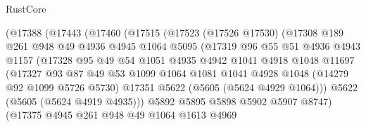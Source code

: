 \begin{lexlean}{RustCore}
\begin{coremodule}
                    (@17388
                      (@17443
                        (@17460
                          (@17515
                            (@17523
                              (@17526 @17530)
                              (@17308
                                @189
                                @261
                                @948
                                @49
                                @4936
                                @4945
                                @1064
                                @5095
                                (@17319
                                  @96
                                  @55
                                  @51
                                  @4936
                                  @4943
                                  @1157
                                  (@17328
                                    @95
                                    @49
                                    @54
                                    @1051
                                    @4935
                                    @4942
                                    @1041
                                    @4918
                                    @1048
                                    @11697
                                    (@17327
                                      @93
                                      @87
                                      @49
                                      @53
                                      @1099
                                      @1064
                                      @1081
                                      @1041
                                      @4928
                                      @1048
                                      (@14279 @92 @1099 @5726 @5730)
                                      @17351
                                      @5622
                                      (@5605 (@5624 @4929 @1064)))
                                    @5622
                                    (@5605 (@5624 @4919 @4935)))
                                  @5892
                                  @5895
                                  @5898
                                  @5902
                                  @5907
                                  @8747)
                                (@17375
                                  @4945
                                  @261
                                  @948
                                  @49
                                  @1064
                                  @1613
                                  @4969

\end{coremodule}
\end{lexlean}
